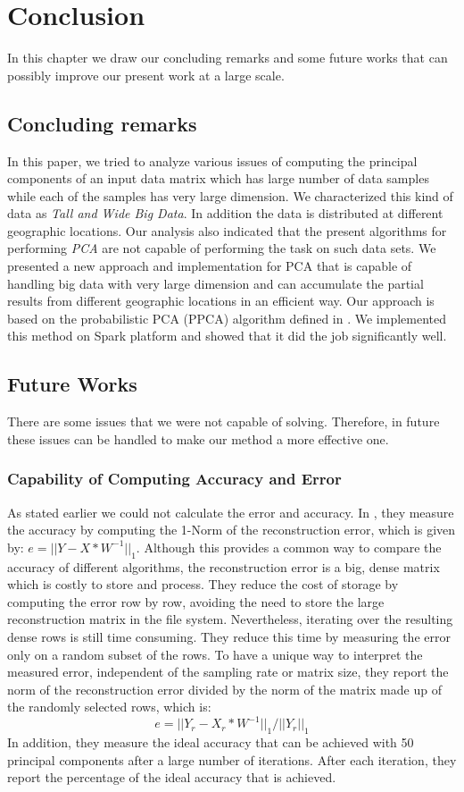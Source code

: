 \chapter{Conclusion}
	\label{c:10}
In this chapter we draw our concluding remarks and some future works that can possibly improve our present work at  a large scale.
\section{Concluding remarks}
In this paper, we tried to analyze various issues of computing the principal components of an input data matrix which has large number of data samples while each of the samples has very large dimension. We characterized this kind of data as \textit{Tall and Wide Big Data}. In addition the data is distributed at different geographic locations. Our analysis also indicated that the present algorithms for performing \textit{PCA} are not capable of performing the task on such data sets. We presented a new approach and implementation for PCA that is capable of handling big data with very large dimension and can accumulate the partial results from different geographic locations in an efficient way. Our approach is based on the probabilistic PCA (PPCA) algorithm defined in \cite{bishop}. We implemented this method on Spark platform and showed that it did the job significantly well.  
\section{Future Works}
There are some issues that we were not capable of solving. Therefore, in future these issues can be handled to make our method a more effective one.
\subsection{Capability of Computing Accuracy and Error}
As stated earlier we could not calculate the error and accuracy. In \cite{elgamal}, they measure the accuracy by computing the 1-Norm of the reconstruction error, which is given by: $e = ||Y -X * W^{-1}||_1$. Although this provides a common way to compare the accuracy of different algorithms, the reconstruction error is a big, dense matrix which is costly to store and process. They reduce the cost of storage by computing the error row by row, avoiding the need to store the large reconstruction matrix in the file system. Nevertheless, iterating over the resulting dense rows is still time consuming. They reduce this time by measuring the error only on a random subset of the rows. To have a unique way to interpret the measured error, independent of the sampling rate or matrix size, they report the norm of the reconstruction error divided by the norm of the matrix made up of the randomly selected rows, which is:
$$e=||Y_r - X_r*W^{-1}||_1/||Y_r||_1$$
In addition, they measure the ideal accuracy that can be achieved with 50 principal components after a large number of iterations. After each iteration, they report the percentage of the ideal accuracy that is achieved.

